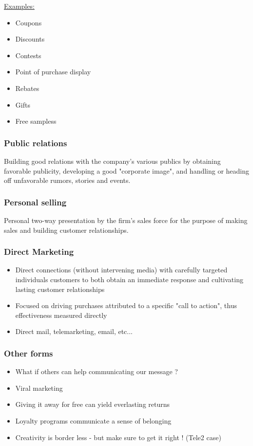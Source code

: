 \documentclass[a4paper,titlepage] {scrartcl}
\begin{document}
\underline{Examples:}
\begin{itemize}
	\item Coupons
	\item Discounts
	\item Contests
	\item Point of purchase display
	\item Rebates
	\item Gifts
	\item Free sampless
\end{itemize}

\subsubsection{Public relations} %
\label{par:public_relations}
Building good relations with the company's various publics by obtaining favorable publicity, developing a good "corporate image", and handling or heading off unfavorable rumors, stories and events.

\subsubsection{Personal selling}
Personal two-way presentation  by the firm's sales force for the purpose of making sales and building customer relationships.

\subsubsection{Direct Marketing}
\begin{itemize}
	\item Direct connections (without intervening media) with carefully targeted individuals customers to both obtain an immediate response and cultivating lasting customer relationships
	\item Focused on driving purchases attributed to a specific "call to action", thus effectiveness measured directly
	\item Direct mail, telemarketing, email, etc...
\end{itemize}

\subsubsection{Other forms}
\begin{itemize}
	\item What if others can help communicating our message ?
	\item Viral marketing
	\item  Giving it away for free can yield everlasting returns
	\item Loyalty programs communicate a sense of belonging
	\item Creativity is border less - but make sure to get it right ! (Tele2 case)
\end{itemize}
\end{document}
